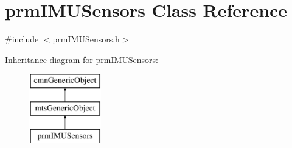 \hypertarget{classprm_i_m_u_sensors}{}\section{prm\+I\+M\+U\+Sensors Class Reference}
\label{classprm_i_m_u_sensors}


{\ttfamily \#include $<$prm\+I\+M\+U\+Sensors.\+h$>$}

Inheritance diagram for prm\+I\+M\+U\+Sensors\+:\begin{figure}[H]
\begin{center}
\leavevmode
\includegraphics[height=3.000000cm]{d8/d35/classprm_i_m_u_sensors}
\end{center}
\end{figure}
